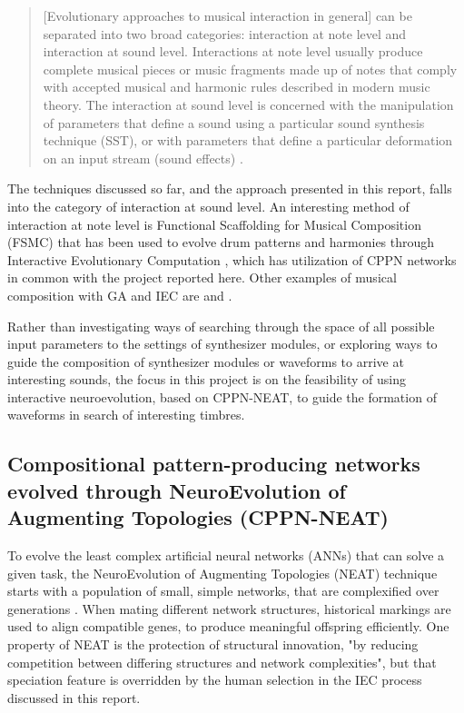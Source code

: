 \documentclass[conference]{IEEEtran}
\begin{document}
\begin{quote}
[Evolutionary approaches to musical interaction in general] can be separated into two broad categories: interaction at note level and interaction at sound level.  Interactions at note level usually produce complete musical pieces or music fragments made up of notes that comply with accepted musical and harmonic rules  described in modern music theory.  The interaction at sound level is concerned with the manipulation of parameters that define a sound using a particular sound synthesis technique (SST), or with parameters that define a particular deformation on an input stream (sound effects) \cite{mandelis2004don}.
\end{quote}

The techniques discussed so far, and the approach presented in this report, falls into the category of interaction at sound level.  An interesting method of interaction at note level is Functional Scaffolding for Musical Composition (FSMC) that has been used to evolve drum patterns and harmonies through Interactive Evolutionary Computation \cite{hoover2011interactively}\cite{hoover2009exploiting}\cite{hoover2011generating}\cite{hoover2008scaffolding}, which has utilization of CPPN networks in common with the project reported here.  Other examples of musical composition with GA and IEC are \cite{tokui2000music} and \cite{dahlstedt2001mutasynth}\cite{Dahlstedt2004suo}.

Rather than investigating ways of searching through the space of all possible input parameters to the settings of synthesizer modules, or exploring ways to guide the composition of synthesizer modules or waveforms to arrive at interesting sounds, the focus in this project is on the feasibility of using interactive neuroevolution, based on CPPN-NEAT, to guide the formation of waveforms in search of interesting timbres.


\subsection{Compositional pattern-producing networks evolved through NeuroEvolution of Augmenting Topologies (CPPN-NEAT)}

To evolve the least complex artificial neural networks (ANNs) that can solve a given task, the NeuroEvolution of Augmenting Topologies (NEAT) technique starts with a population of small, simple networks, that are complexified over generations \cite{stanley2002evolving}.  When mating different network structures, historical markings are used to align compatible genes, to produce meaningful offspring efficiently.  One property of NEAT is the protection of structural innovation, "by reducing competition between differing structures and network complexities"\cite{hastings2009evolving}, but that speciation feature is overridden by the human selection in the IEC process discussed in this report.
\end{document}
